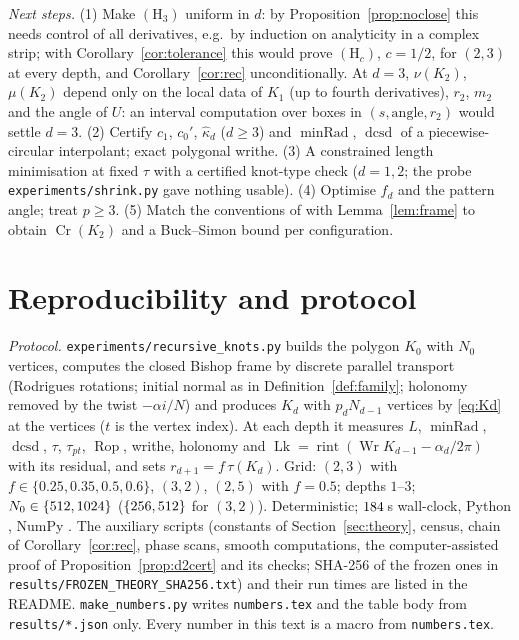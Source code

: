\documentclass[10pt,a4paper]{article}
\theoremstyle{plain}
\theoremstyle{definition}
\theoremstyle{remark}
\newcommand{\Rop}{\operatorname{Rop}}
\newcommand{\Wr}{\operatorname{Wr}}
\newcommand{\Lk}{\operatorname{Lk}}
\newcommand{\Cr}{\operatorname{Cr}}
\newcommand{\minRad}{\operatorname{minRad}}
\newcommand{\dcsd}{\operatorname{dcsd}}
\begin{document}
\emph{Next steps.} (1) Make $(\mathrm H_3)$ uniform in $d$: by Proposition~\ref{prop:noclose} this needs control of all derivatives, e.g.\ by induction on analyticity in a complex strip; with Corollary~\ref{cor:tolerance} this would prove $(\mathrm H_c)$, $c=1/2$, for $(2,3)$ at every depth, and Corollary~\ref{cor:rec} unconditionally. At $d=3$, $\nu(K_2)$, $\mu(K_2)$ depend only on the local data of $K_1$ (up to fourth derivatives), $r_2$, $m_2$ and the angle of $U$: an interval computation over boxes in $(s,\text{angle},r_2)$ would settle $d=3$. (2) Certify $c_1$, $c_0'$, $\hat\kappa_d$ ($d\ge3$) and $\minRad$, $\dcsd$ of a piecewise-circular interpolant; exact polygonal writhe. (3) A constrained length minimisation at fixed $\tau$ with a certified knot-type check ($d=1,2$; the probe \texttt{experiments/shrink.py} gave nothing usable). (4) Optimise $f_d$ and the pattern angle; treat $p\ge3$. (5) Match the conventions of \cite{KalfagianniMcConkey2024} with Lemma~\ref{lem:frame} to obtain $\Cr(K_2)$ and a Buck--Simon bound per configuration.

\appendix
\section{Reproducibility and protocol}\label{app:repro}

{\sloppy
\emph{Protocol.} \texttt{experiments/recursive\_knots.py} builds the polygon $K_0$ with $N_0$ vertices, computes the closed Bishop frame by discrete parallel transport (Rodrigues rotations; initial normal as in Definition~\ref{def:family}; holonomy removed by the twist $-\alpha i/N$) and produces $K_d$ with $p_dN_{d-1}$ vertices by \eqref{eq:Kd} at the vertices ($t$ is the vertex index). At each depth it measures $L$, $\minRad$, $\dcsd$, $\tau$, $\tau_{pt}$, $\Rop$, writhe, holonomy and $\Lk=\operatorname{rint}(\Wr K_{d-1}-\alpha_d/2\pi)$ with its residual, and sets $r_{d+1}=f\,\tau(K_d)$. Grid: $(2,3)$ with $f\in\{0.25,0.35,0.5,0.6\}$, $(3,2)$, $(2,5)$ with $f=0.5$; depths $1$--$3$; $N_0\in\{512,1024\}$ ($\{256,512\}$ for $(3,2)$). Deterministic; $184$\,s wall-clock, Python \MetaPython, NumPy \MetaNumpy. The auxiliary scripts (constants of Section~\ref{sec:theory}, census, chain of Corollary~\ref{cor:rec}, phase scans, smooth computations, the computer-assisted proof of Proposition~\ref{prop:d2cert} and its checks; SHA-256 of the frozen ones in \texttt{results/FROZEN\_THEORY\_SHA256.txt}) and their run times are listed in the README. \texttt{make\_numbers.py} writes \texttt{numbers.tex} and the table body from \texttt{results/*.json} only. Every number in this text is a macro from \texttt{numbers.tex}.\par}

\renewcommand{\bibfont}{\footnotesize}
\setlength{\bibsep}{1pt plus 0.5pt}


\end{document}
